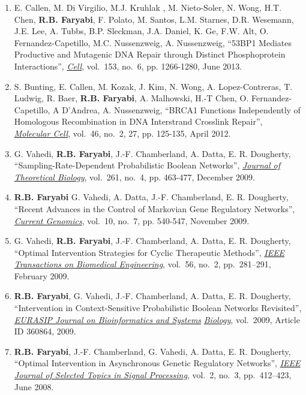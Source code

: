 \documentclass[12pt, centered, centered]{res_yy}
\begin{document}
\begin{resume}
\begin{enumerate}
\item  E. Callen, M. Di Virgilio, M.J. Kruhlak , M. Nieto-Soler, N. Wong, H.T. Chen,  {\bf {R.B. Faryabi}}, F. Polato, M. Santos, L.M. Starnes, D.R. Wesemann, J.E. Lee, A. Tubbs, B.P. Sleckman, J.A. Daniel, K. Ge, F.W. Alt, O. Fernandez-Capetillo, M.C. Nussenzweig, A. Nussenzweig, ``53BP1 Mediates Productive and Mutagenic DNA Repair through Distinct Phosphoprotein Interactions'', \underline{{\emph{Cell}}},  vol.~153, no.~6, pp. 1266-1280, June 2013.

\item  S. Bunting, E. Callen, M. Kozak,  J. Kim,  N. Wong, A. Lopez-Contreras, T. Ludwig, R. Baer, {\bf {R.B. Faryabi}}, A. Malhowski, H.-T Chen, O. Fernandez-Capetillo, A D'Andrea, A. Nussenzweig, ``BRCA1 Functions Independently of Homologous Recombination in DNA Interstrand Crosslink Repair'',  \\ \underline{{\emph{Molecular Cell}}}, vol.~46, no.~2, 27, pp. 125-135, April 2012.

\item G. Vahedi, {\bf {R.B. Faryabi}}, J.-F. Chamberland, A. Datta, E. R. Dougherty, 
``Sampling-Rate-Dependent Probabilistic Boolean Networks'',  \underline{{\emph{Journal of Theoretical Biology}}}, vol.~261, no.~4, pp. 463-477, December 2009.

\item {\bf {R.B. Faryabi}} G. Vahedi, A. Datta, J.-F. Chamberland, E. R. Dougherty, 
``Recent Advances in the Control of Markovian Gene Regulatory Networks'', \underline{{\emph{Current Genomics}}}, vol.~10, no.~7, pp. 540-547, November 2009.

\item G. Vahedi, {\bf {R.B. Faryabi}}, J.-F. Chamberland, A. Datta, E. R. Dougherty, 
``Optimal Intervention Strategies for Cyclic Therapeutic Methods'', \underline{{\emph{IEEE Transactions on Biomedical Engineering}}},  vol.~56, no.~2, pp.~281--291, 
February 2009.

\item {\bf {R.B. Faryabi}}, G. Vahedi, J.-F. Chamberland, A. Datta, E. R. Dougherty, 
``Intervention in Context-Sensitive Probabilistic Boolean Networks Revisited'', \underline{{\emph{EURASIP Journal on Bioinformatics and Systems}}} \underline{{\emph{Biology}}}, vol.~2009, Article ID 360864, 2009.

\item {\bf {R.B. Faryabi}}, J.-F. Chamberland, G. Vahedi, A. Datta, E. R. Dougherty, 
``Optimal Intervention in Asynchronous Genetic Regulatory Networks'', \underline{{\emph{IEEE Journal of Selected Topics in Signal Processing}}}, 
vol.~2, no.~3, pp.~412--423, June 2008.


\end{enumerate}
\end{resume}
\end{document}
